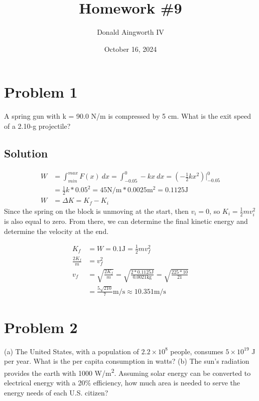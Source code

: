 \documentclass[12pt]{article}
\title{Homework \#9}
\author{Donald Aingworth IV}
\date{October 16, 2024}
\begin{document}

\maketitle

\pagebreak
\section*{Problem 1}
A spring gun with k = 90.0 N/m is compressed by 5 cm. What is the exit speed of a 2.10-g projectile?

\subsection*{Solution}

\begin{align*}
    W   &= \int_{min}^{max} F(x)\ dx = \int_{-0.05}^{0} -kx\ dx = \left(-\frac{1}{2}kx^2\right)\vert_{-0.05}^{0} \\
        &= \frac{1}{2}k*0.05^2 = 45\unit{\newton/\meter} * 0.0025\unit{\meter^2} = 0.1125 \unit{\joule}\\
    W   &=  \Delta K = K_f - K_i
\end{align*}
Since the spring on the block is unmoving at the start, then $v_i = 0$, so $K_i = \frac{1}{2}mv_i^2$ is also equal to zero. From there, we can determine the final kinetic energy and determine the velocity at the end.

\begin{align*}
    K_f &= W = 0.1\unit{\joule} = \frac{1}{2}mv_f^2\\
    \frac{2K_f}{m} &= v_f^2\\
    v_f &= \sqrt{\frac{2K_f}{m}} 
        = \sqrt{\frac{2*0.1125\unit{\joule}}{0.0021\unit{\kilo\gram}}}
        = \sqrt{\frac{225*10}{21}}\\
        &= \boxed{\frac{5\sqrt{210}}{7} \unit{\meter/\second} \approx 10.351 \unit{\meter/\second}}
\end{align*}

\pagebreak
\section*{Problem 2}
(a) The United States, with a population of $2.2 \times 10^8$ people, consumes $5 \times 10^{19}$ J per year. What is the per capita consumption in watts? (b) The sun's radiation provides the earth with 1000 \unit{\watt/\meter^2}. Assuming solar energy can be converted to electrical energy with a 20\% efficiency, how much area is needed to serve the energy needs of each U.S. citizen?
\end{document}
